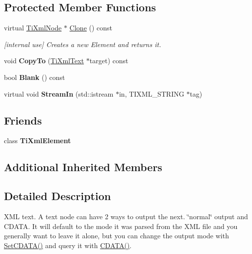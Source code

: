 \subsection*{Protected Member Functions}
\begin{DoxyCompactItemize}
\item 
\mbox{\label{class_ti_xml_text_a98a20d7a4f1c1478e25e34921be24bfe}} 
virtual \hyperlink{class_ti_xml_node}{Ti\+Xml\+Node} $\ast$ \hyperlink{class_ti_xml_text_a98a20d7a4f1c1478e25e34921be24bfe}{Clone} () const
\begin{DoxyCompactList}\small\item\em \mbox{[}internal use\mbox{]} Creates a new Element and returns it. \end{DoxyCompactList}\item 
\mbox{\label{class_ti_xml_text_a480b8e0ad6b7833a73ecf2191195c9b5}} 
void {\bfseries Copy\+To} (\hyperlink{class_ti_xml_text}{Ti\+Xml\+Text} $\ast$target) const
\item 
\mbox{\label{class_ti_xml_text_a0fd9005b279def46859b72f336b158da}} 
bool {\bfseries Blank} () const
\item 
\mbox{\label{class_ti_xml_text_a261e07cdbd5363f994371320414c17d9}} 
virtual void {\bfseries Stream\+In} (std\+::istream $\ast$in, T\+I\+X\+M\+L\+\_\+\+S\+T\+R\+I\+NG $\ast$tag)
\end{DoxyCompactItemize}
\subsection*{Friends}
\begin{DoxyCompactItemize}
\item 
\mbox{\label{class_ti_xml_text_ab6592e32cb9132be517cc12a70564c4b}} 
class {\bfseries Ti\+Xml\+Element}
\end{DoxyCompactItemize}
\subsection*{Additional Inherited Members}


\subsection{Detailed Description}
X\+ML text. A text node can have 2 ways to output the next. \char`\"{}normal\char`\"{} output and C\+D\+A\+TA. It will default to the mode it was parsed from the X\+ML file and you generally want to leave it alone, but you can change the output mode with \hyperlink{class_ti_xml_text_acb17ff7c5d09b2c839393445a3de5ea9}{Set\+C\+D\+A\+T\+A()} and query it with \hyperlink{class_ti_xml_text_aac1f4764d220ed6bf809b16dfcb6b45a}{C\+D\+A\+T\+A()}. 


